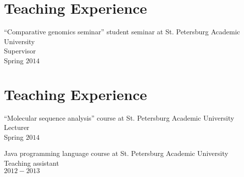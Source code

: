 \section{Teaching Experience}
``Comparative genomics seminar'' student seminar at St. Petersburg Academic University\\
Supervisor\\
Spring $2014$

\section{Teaching Experience}
``Molecular sequence analysis'' course at St. Petersburg Academic University\\
Lecturer\\
Spring $2014$

\blankline

Java programming language course at St. Petersburg Academic University\\
Teaching assistant\\ 
$2012-2013$



